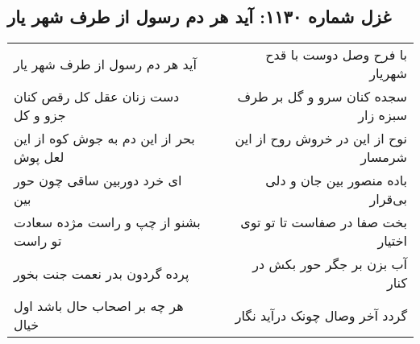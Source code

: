 \begin{center}
\section*{غزل شماره ۱۱۳۰: آید هر دم رسول از طرف شهر یار}
\label{sec:1130}
\begin{longtable}{l p{0.5cm} r}
آید هر دم رسول از طرف شهر یار
&&
با فرح وصل دوست با قدح شهریار
\\
دست زنان عقل کل رقص کنان جزو و کل
&&
سجده کنان سرو و گل بر طرف سبزه زار
\\
بحر از این دم به جوش کوه از این لعل پوش
&&
نوح از این در خروش روح از این شرمسار
\\
ای خرد دوربین ساقی چون حور بین
&&
باده منصور بین جان و دلی بی‌قرار
\\
بشنو از چپ و راست مژده سعادت تو راست
&&
بخت صفا در صفاست تا تو توی اختیار
\\
پرده گردون بدر نعمت جنت بخور
&&
آب بزن بر جگر حور بکش در کنار
\\
هر چه بر اصحاب حال باشد اول خیال
&&
گردد آخر وصال چونک درآید نگار
\\
\end{longtable}
\end{center}
